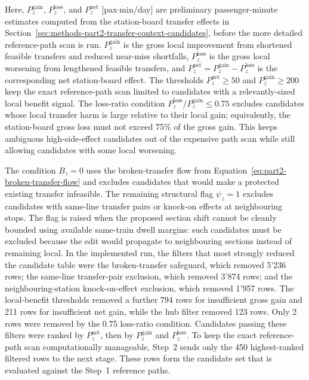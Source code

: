 \documentclass[preprint,12pt]{elsarticle}
\begin{document}
Here, \(P^{\mathrm{gain}}_z\), \(P^{\mathrm{loss}}_z\), and \(P^{\mathrm{net}}_z\) [pax\(\cdot\)min/day] are preliminary passenger-minute estimates computed from the station-board transfer effects in Section~\ref{sec:methods-part2-transfer-context-candidates}, before the more detailed reference-path scan is run. \(P^{\mathrm{gain}}_z\) is the gross local improvement from shortened feasible transfers and reduced near-miss shortfalls, \(P^{\mathrm{loss}}_z\) is the gross local worsening from lengthened feasible transfers, and \(P^{\mathrm{net}}_z=P^{\mathrm{gain}}_z-P^{\mathrm{loss}}_z\) is the corresponding net station-board effect. The thresholds \(P^{\mathrm{net}}_z\ge50\) and \(P^{\mathrm{gain}}_z\ge200\) keep the exact reference-path scan limited to candidates with a relevantly-sized local benefit signal. The loss-ratio condition \(P^{\mathrm{loss}}_z/P^{\mathrm{gain}}_z\le0.75\) excludes candidates whose local transfer harm is large relative to their local gain; equivalently, the station-board gross loss must not exceed 75\% of the gross gain. This keeps ambiguous high-side-effect candidates out of the expensive path scan while still allowing candidates with some local worsening.

The condition \(B_z=0\) uses the broken-transfer flow from Equation~\eqref{eq:part2-broken-transfer-flow} and excludes candidates that would make a protected existing transfer infeasible. The remaining structural flag \(\psi_z=1\) excludes candidates with same-line transfer pairs or knock-on effects at neighbouring stops. The flag is raised when the proposed section shift cannot be cleanly bounded using available same-train dwell margins: such candidates must be excluded because the edit would propagate to neighbouring sections instead of remaining local. In the implemented run, the filters that most strongly reduced the candidate table were the broken-transfer safeguard, which removed 5'236 rows; the same-line transfer-pair exclusion, which removed 3'874 rows; and the neighbouring-station knock-on-effect exclusion, which removed 1'957 rows. The local-benefit thresholds removed a further 794 rows for insufficient gross gain and 211 rows for insufficient net gain, while the hub filter removed 123 rows. Only 2 rows were removed by the 0.75 loss-ratio condition. Candidates passing these filters were ranked by \(P^{\mathrm{net}}_z\), then by \(P^{\mathrm{gain}}_z\) and \(P^{\mathrm{loss}}_z\). To keep the exact reference-path scan computationally manageable, Step~2 sends only the 450 highest-ranked filtered rows to the next stage. These rows form the candidate set that is evaluated against the Step~1 reference paths.
\end{document}
